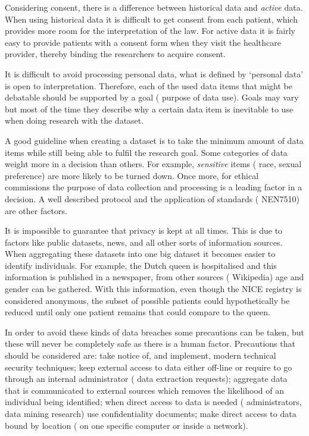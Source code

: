 Considering consent, there is a difference between historical data and \emph{active} data.
When using historical data it is difficult to get consent from each patient, which provides more room for the interpretation of the law.
For active data it is fairly easy to provide patients with a consent form when they visit the healthcare provider, thereby binding the researchers to acquire consent. 

It is difficult to avoid processing personal data, \ie{} what is defined by `personal data' is open to interpretation.
Therefore, each of the used data items that might be debatable should be supported by a goal (\ie{} purpose of data use).
Goals may vary but most of the time they describe why a certain data item is inevitable to use when doing research with the dataset.

A good guideline when creating a dataset is to take the minimum amount of data items while still being able to fulfil the research goal.
Some categories of data weight more in a decision than others.
For example, \emph{sensitive} items (\eg{} race, sexual preference) are more likely to be turned down.
Once more, for ethical commissions the purpose of data collection and processing is a leading factor in a decision. 
A well described protocol and the application of standards (\eg{} NEN7510) are other factors.

It is impossible to guarantee that privacy is kept at all times.
This is due to factors like public datasets, news, and all other sorts of information sources.
When aggregating these datasets into one big dataset it becomes easier to identify individuals. 
For example, the Dutch queen is hospitalised and this information is published in a newspaper, from other sources (\eg{} Wikipedia) age and gender can be gathered.
With this information, even though the NICE registry is considered anonymous, the subset of possible patients could hypothetically be reduced until only one patient remains that could compare to the queen.

In order to avoid these kinds of data breaches some precautions can be taken, but these will never be completely safe as there is a human factor.
Precautions that should be considered are: take notice of, and implement, modern technical security techniques; keep external access to data either off-line or require to go through an internal administrator (\eg{} data extraction requests); aggregate data that is communicated to external sources which removes the likelihood of an individual being identified; when direct access to data is needed (\eg{} administrators, data mining research) use confidentiality documents; make direct access to data bound by location (\eg{} on one specific computer or inside a network).

